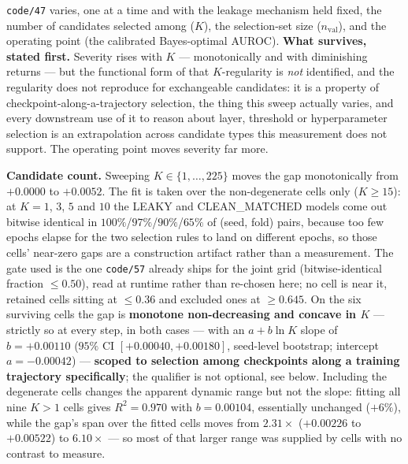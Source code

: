 \documentclass[10pt]{article} %
\begin{document}
\texttt{code/47} varies, one at a time and with the leakage mechanism held
fixed, the number of candidates selected among ($K$), the selection-set size
($n_{\text{val}}$), and the operating point (the calibrated Bayes-optimal
AUROC). \textbf{What survives, stated first.} Severity rises with $K$ ---
monotonically and with diminishing returns --- but the functional form of that
$K$-regularity is \emph{not} identified, and the regularity does not reproduce
for exchangeable candidates: it is a property of
checkpoint-along-a-trajectory selection, the thing this sweep actually varies,
and every downstream use of it to reason about layer, threshold or
hyperparameter selection is an extrapolation across candidate types this
measurement does not support. The operating point moves severity far more.

\textbf{Candidate count.} Sweeping $K\in\{1,\ldots,225\}$ moves the gap
monotonically from $+0.0000$ to $+0.0052$. The fit is taken over the
non-degenerate cells only ($K\geq15$): at $K=1$, $3$, $5$ and $10$ the LEAKY
and CLEAN\_MATCHED models come out bitwise identical in
$100\%$/$97\%$/$90\%$/$65\%$ of (seed, fold) pairs, because too few epochs
elapse for the two selection rules to land on different epochs, so those cells'
near-zero gaps are a construction artifact rather than a measurement. The gate
used is the one \texttt{code/57} already ships for the joint grid
(bitwise-identical fraction $\leq0.50$), read at runtime rather than re-chosen
here; no cell is near it, retained cells sitting at $\leq0.36$ and excluded ones
at $\geq0.645$. On the six surviving cells the gap is \textbf{monotone
non-decreasing and concave in $K$} --- strictly so at every step, in both
cases --- with an $a+b\ln K$ slope of $b=+0.00110$ ($95\%$ CI
$[+0.00040,+0.00180]$, seed-level bootstrap; intercept $a=-0.00042$) ---
\textbf{scoped to selection among checkpoints along a training trajectory
specifically}; the qualifier is not optional, see below. Including
the degenerate cells changes the apparent dynamic range but not the slope:
fitting all nine $K>1$ cells gives $R^2=0.970$ with $b=0.00104$, essentially
unchanged ($+6\%$), while the gap's span over the fitted cells moves from
$2.31\times$ ($+0.00226$ to $+0.00522$) to $6.10\times$ --- so most of that
larger range was supplied by cells with no contrast to measure.
\end{document}
